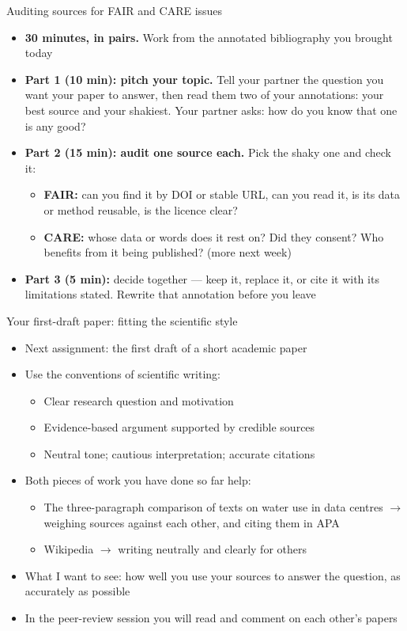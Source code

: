 \documentclass[aspectratio=169]{beamer}
\begin{document}
\begin{frame}{Auditing sources for FAIR and CARE issues}
\begin{itemize}
  \item \textbf{30 minutes, in pairs.}  Work from the annotated bibliography
    you brought today
  \item \textbf{Part 1 (10 min): pitch your topic.}  Tell your partner the
    question you want your paper to answer, then read them two of your
    annotations: your best source and your shakiest.  Your
    partner asks: how do you know that one is any good?
  \item \textbf{Part 2 (15 min): audit one source each.}  Pick the shaky one
    and check it:
    \begin{itemize}
      \item \textbf{FAIR:} can you find it by DOI or stable URL, can you
        read it, is its data or method reusable, is the licence clear?
      \item \textbf{CARE:} whose data or words does it rest on?  Did they
        consent?  Who benefits from it being published? (more next week)
    \end{itemize}
  \item \textbf{Part 3 (5 min):} decide together --- keep it, replace it, or
    cite it with its limitations stated.  Rewrite that
    annotation before you leave
\end{itemize}
\end{frame}

\begin{frame}{Your first-draft paper: fitting the scientific style}
\begin{itemize}
  \item Next assignment: the first draft of a short academic paper
  \item Use the conventions of scientific writing:
    \begin{itemize}
      \item Clear research question and motivation
      \item Evidence-based argument supported by credible sources
      \item Neutral tone; cautious interpretation; accurate citations
    \end{itemize}
  \item Both pieces of work you have done so far help:
    \begin{itemize}
      \item The three-paragraph comparison of texts on water use in data centres
        $\rightarrow$ weighing sources against each other, and citing them in APA
      \item Wikipedia $\rightarrow$ writing neutrally and clearly for others
    \end{itemize}
  \item What I want to see: how well you use your sources to answer the
    question, as accurately as possible
  \item In the peer-review session you will read and comment on each other's papers
\end{itemize}
\end{frame}
\end{document}
